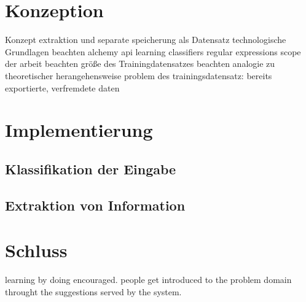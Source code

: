 \chapter{Konzeption}
Konzept extraktion und separate speicherung als Datensatz
technologische Grundlagen beachten
alchemy api
learning classifiers
regular expressions
scope der arbeit beachten
größe des Trainingdatensatzes beachten
analogie zu theoretischer herangehensweise
problem des trainingsdatensatz: bereits exportierte, verfremdete daten
\chapter{Implementierung}
\section{Klassifikation der Eingabe}
\section{Extraktion von Information}

\chapter{Schluss}
learning by doing encouraged. people get introduced to the problem domain throught the suggestions served by the system.


